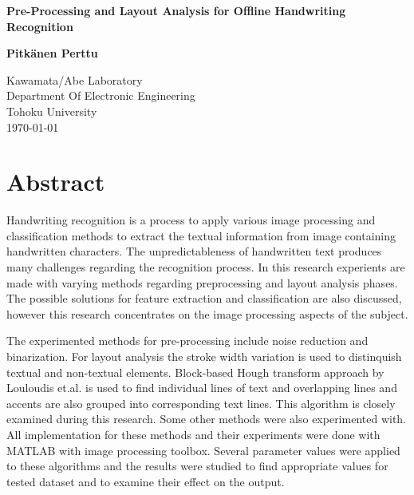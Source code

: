 \documentclass{article}
\begin{document}
   \begin{titlepage}
     \begin{center}
       \vspace*{1cm}

        \huge
        \textbf{Pre-Processing and Layout Analysis for Offline Handwriting Recognition}

        \vspace{1cm}
        \LARGE
        \textbf{Pitk{\"a}nen Perttu}

        \vfill
        \Large
        Kawamata/Abe Laboratory\\
        Department Of Electronic Engineering\\
        Tohoku University\\
        \today
     \end{center}
   \end{titlepage}

   \newpage
   \section*{Abstract}
    Handwriting recognition is a process to apply various image processing and classification methods to extract the textual information from image containing handwritten characters. The unpredictableness of handwritten text produces many challenges regarding the recognition process. In this research experients are made with varying methods regarding preprocessing and layout analysis phases. The possible solutions for feature extraction and classification are also discussed, however this research concentrates on the image processing aspects of the subject.

    The experimented methods for pre-processing include noise reduction and binarization. For layout analysis the stroke width variation is used to distinquish textual and non-textual elements. Block-based Hough transform approach by Louloudis et.al. is used to find individual lines of text and overlapping lines and accents are also grouped into corresponding text lines. This algorithm is closely examined during this research. Some other methods were also experimented with. All implementation for these methods and their experiments were done with MATLAB with image processing toolbox. Several parameter values were applied to these algorithms and the results were studied to find appropriate values for tested dataset and to examine their effect on the output.
\end{document}
